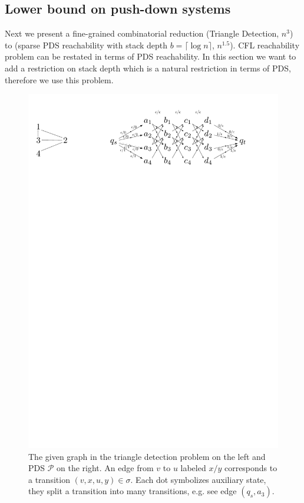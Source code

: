 \documentclass[12pt]{article}
\begin{document}
\subsection{Lower bound on push-down systems}
\label{subsec:pds}

Next we present a fine-grained combinatorial reduction (Triangle Detection, $n^3$) to (sparse PDS reachability with stack depth $b = \lceil \log n \rceil$, $n^{1.5}$). CFL reachability problem can be restated in terms of PDS reachability. In this section we want to add a restriction on stack depth which is a natural restriction in terms of PDS, therefore we use this problem.

\begin{figure}[!htp]
		
	\begin{center}  
		\includegraphics[scale=0.9]{pictures/triangle_to_pds.pdf}
	\end{center}
	
	\caption{The given graph in the triangle detection problem on the left and PDS $\mathcal{P}$ on the right. An edge from $v$ to $u$ labeled $x/y$ corresponds to a transition $(v,x,u,y) \in \sigma$. Each dot symbolizes auxiliary state, they split a transition into many transitions, e.g. see edge $(q_s, a_3)$.}
	\label{fig:triangle_to_pds}
	
\end{figure}
\end{document}
